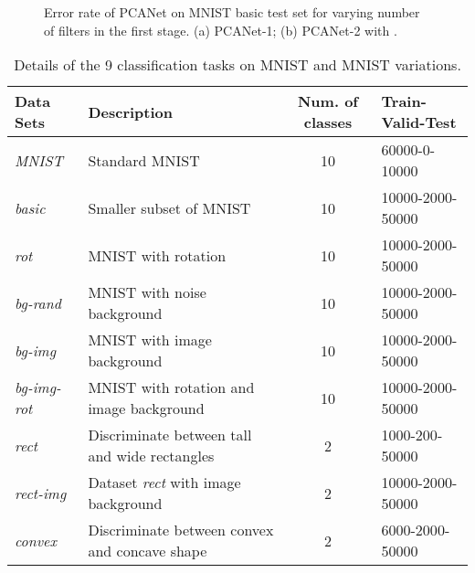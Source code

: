 \documentclass[10pt,journal,compsoc]{IEEEtran}
\begin{document}
\begin{figure}[t]
\centering
{}\hspace{0cm} 
\caption{Error rate of PCANet on MNIST basic test set for varying number of filters in the first stage. (a) PCANet-1; (b) PCANet-2 with .}\label{fig: mnist_basic_num_filters}
\end{figure}



\begin{table*}[htbp]\caption{Details of the 9 classification tasks on MNIST and MNIST variations.}\label{table: mnist_details}
\centering
\begin{tabular}{l|l|c|l}
   \hline
{Data Sets}   & { Description} & { Num. of classes} & { Train-Valid-Test} \\ \hline \hline
   {\it MNIST}       & {\rm Standard MNIST} & 10 & 60000-0-10000 \\
   {\it basic}       & {\rm Smaller subset of MNIST} & 10 & 10000-2000-50000 \\
   {\it rot}         & {\rm MNIST with rotation} & 10 & 10000-2000-50000 \\
   {\it bg-rand}     & {\rm MNIST with noise background} & 10 & 10000-2000-50000 \\
   {\it bg-img}      & {\rm MNIST with image background} & 10 & 10000-2000-50000 \\
   {\it bg-img-rot}  & {\rm MNIST with rotation and image background} & 10 & 10000-2000-50000 \\
   {\it rect}        & {\rm Discriminate between tall and wide rectangles} & 2 & 1000-200-50000 \\
   {\it rect-img}    & {\rm Dataset {\it rect} with image background} & 2 & 10000-2000-50000 \\
   {\it convex}      & {\rm Discriminate between convex and concave shape} & 2 & 6000-2000-50000 \\
   \hline
\end{tabular}\end{table*}
\end{document}
